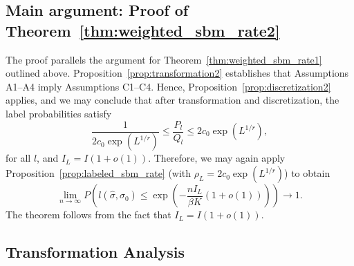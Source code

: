 \documentclass{article}
\begin{document}
\subsection{Main argument: Proof of Theorem~\ref{thm:weighted_sbm_rate2}}
\label{AppThmRate2}

The proof parallels the argument for Theorem~\ref{thm:weighted_sbm_rate1} outlined above. Proposition~\ref{prop:transformation2} establishes that Assumptions A1--A4 imply Assumptions C1--C4. Hence, Proposition~\ref{prop:discretization2} applies, and we may conclude that after transformation and discretization, the label probabilities satisfy 
\[
\frac{1}{2c_0 \exp(L^{1/r})} \leq \frac{P_l}{Q_l} \leq 2c_0 \exp(L^{1/r}),
\]
for all $l$, and $I_L = I(1+o(1))$. Therefore, we may again apply Proposition~\ref{prop:labeled_sbm_rate} (with $\rho_L = 2 c_0 \exp(L^{1/r})$) to obtain
\[
\lim_{n \rightarrow \infty} P \left( l(\hat{\sigma}, \sigma_0) \leq \exp \left( - \frac{ n I_L}{ \beta K} (1 + o(1)) \right) \right) \rightarrow 1.
\]
The theorem follows from the fact that $I_L = I(1+o(1))$. 

\subsection{Transformation Analysis}
\end{document}
